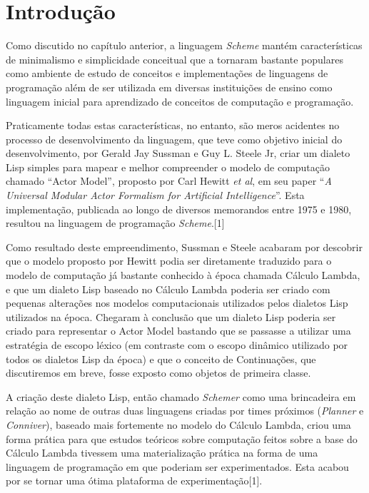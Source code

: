 
\section{Introdução}
\label{sec:introducao_scheme}

Como discutido no capítulo anterior, a linguagem \textit{Scheme} mantém características
de minimalismo e simplicidade conceitual que a tornaram bastante populares como
ambiente de estudo de conceitos e implementações de linguagens de programação
além de ser utilizada em diversas instituições de ensino como linguagem inicial
para aprendizado de conceitos de computação e programação.

Praticamente todas estas características, no entanto, são meros acidentes no
processo de desenvolvimento da linguagem, que teve como objetivo inicial do
desenvolvimento, por Gerald Jay Sussman e Guy L. Steele Jr, criar um dialeto
Lisp simples para mapear e melhor compreender o modelo de computação chamado
``Actor Model'', proposto por Carl Hewitt \textit{et al}, em seu paper ``\textit{A Universal
Modular Actor Formalism for Artificial Intelligence}''. Esta implementação,
publicada ao longo de diversos memorandos entre 1975 e 1980, resultou na
linguagem de programação \textit{Scheme}.[1]

Como resultado deste empreendimento, Sussman e Steele acabaram por descobrir
que o modelo proposto por Hewitt podia ser diretamente traduzido para o modelo
de computação já bastante conhecido à época chamada Cálculo Lambda, e que um
dialeto Lisp baseado no Cálculo Lambda poderia ser criado com pequenas
alterações nos modelos computacionais utilizados pelos dialetos Lisp utilizados
na época. Chegaram à conclusão que um dialeto Lisp poderia ser criado para
representar o Actor Model bastando que se passasse a utilizar uma estratégia de
escopo léxico (em contraste com o escopo dinâmico utilizado por todos os
dialetos Lisp da época) e que o conceito de Continuações, que discutiremos em
breve, fosse exposto como objetos de primeira classe.

A criação deste dialeto Lisp, então chamado \textit{Schemer} como uma
brincadeira em relação ao nome de outras duas linguagens criadas por times
próximos (\textit{Planner} e \textit{Conniver}), baseado mais fortemente no
modelo do Cálculo Lambda, criou uma forma prática para que estudos teóricos
sobre computação feitos sobre a base do Cálculo Lambda tivessem uma
materialização prática na forma de uma linguagem de programação em que poderiam
ser experimentados. Esta acabou por se tornar uma ótima plataforma de
experimentação[1].

